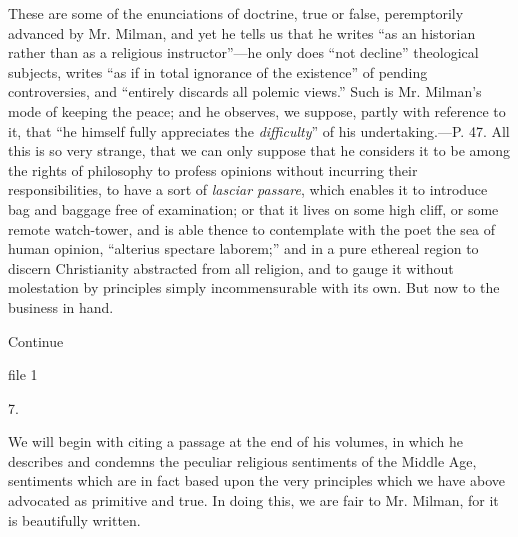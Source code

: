 These are some of the enunciations of doctrine,
true or false, peremptorily advanced by Mr. Milman, and yet he tells
us that he writes ``as an historian rather than as a religious
instructor''—he only does ``not decline'' theological subjects, writes ``as
if in total ignorance of the existence'' of pending controversies, and ``entirely
discards all polemic views.'' Such is Mr. Milman's mode of keeping the
peace; and he observes, we suppose, partly with reference to it, that ``he
himself fully appreciates the \emph{difficulty}'' of his
undertaking.—P. 47. All this is so very strange, that we can only
suppose that he considers it to be among the rights of philosophy to
profess opinions without incurring their responsibilities, to have a
sort of \emph{lasciar passare}, which enables it to introduce bag and
baggage free of examination; or that it lives on some high cliff, or
some remote watch-tower, and is able thence to contemplate with the
poet the sea of human opinion, ``alterius spectare laborem;'' and in a
pure ethereal region to discern Christianity abstracted from all
religion, and to gauge it without molestation by principles simply
incommensurable with its own. But now to the business in hand.

Continue


file 1

7.

We will begin with citing a passage at the end of
his volumes, in which he describes and condemns the peculiar religious
sentiments of the Middle Age, sentiments which are in fact based upon
the very principles which we have above advocated as primitive and
true. In doing this, we are fair to Mr. Milman, for it is beautifully
written.

